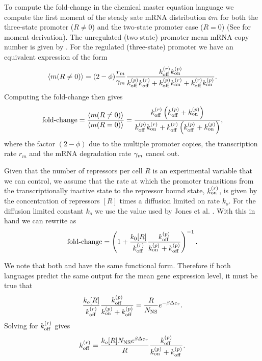 To compute the fold-change in the chemical master equation language we compute
the first moment of the steady sate mRNA distribution $\ee{m}$ for both the
three-state promoter ($R \neq 0$) and the two-state promoter case ($R=0$) (See
 for moment derivation). The unregulated (two-state)
promoter mean mRNA copy number is given by . For
the regulated (three-state) promoter we have an equivalent expression of the
form
\begin{equation}
  \left\langle m (R \neq 0) \right\rangle = (2 - \phi){r_m \over \gamma _m} {k^{(r)}_{\text{off}}k^{(p)}_{\text{on}}
  \over k^{(p)}_{\text{off}}k^{(r)}_{\text{off}} + k^{(p)}_{\text{off}}k^{(r)}_{\text{on}} + k^{(r)}_{\text{off}}k^{(p)}_{\text{on}}}.
\end{equation}
Computing the fold-change then gives
\begin{equation}
  \text{fold-change} = {\left\langle m (R \neq 0) \right\rangle \over \left\langle m (R = 0) \right\rangle} =
  {k^{(r)}_{\text{off}} \left( k^{(p)}_{\text{off}} + k^{(p)}_{\text{on}} \right) \over
  k^{(p)}_{\text{off}}k^{(r)}_{\text{on}} + k^{(r)}_{\text{off}} \left( k^{(p)}_{\text{off}} + k^{(p)}_{\text{on}} \right)},
  \label{seq_fold_change_cme}
\end{equation}
where the factor $(2 - \phi)$ due to the multiple promoter copies, the
transcription rate $r_m$ and the mRNA degradation rate $\gamma _m$ cancel out.

Given that the number of repressors per cell $R$ is an experimental variable
that we can control, we assume that the rate at which the promoter transitions
from the transcriptionally inactive state to the repressor bound state,
$k^{(r)}_{\text{on}}$, is given by the concentration of repressors $[R]$ times a diffusion
limited on rate $k_o$. For the diffusion limited constant $k_o$ we use the
value used by Jones et al. \cite{Jones2014a}. With this in hand we can rewrite
 as
\begin{equation}
  \text{fold-change} = \left( 1 + {k_0 [R] \over k^{(r)}_{\text{off}}}
                {k^{(p)}_{\text{off}} \over k^{(p)}_{\text{on}} + k^{(p)}_{\text{off}}} \right)^{-1}.
  \label{seq_fc_kinetic}
\end{equation}

We note that both  and  have the same
functional form. Therefore if both languages predict the same output for the
mean gene expression level, it must be true that
\begin{equation}
  {k_o [R] \over k^{(r)}_{\text{off}}}{k^{(p)}_{\text{off}}\over k^{(p)}_{\text{on}}+ k^{(p)}_{\text{off}}} =
  {R \over N_\text{NS}} e^{-\beta\Delta\varepsilon_r}.
\end{equation}
Solving for $k^{(r)}_{\text{off}}$ gives
\begin{equation}
  k^{(r)}_{\text{off}} = {k_o [R] N_\text{NS} e^{\beta\Delta\varepsilon_r} \over R}{k^{(p)}_{\text{off}} \over k^{(p)}_{\text{on}} + k^{(p)}_{\text{off}}}.
  \label{seq_kroff_complete}
\end{equation}

